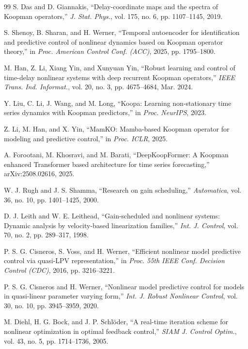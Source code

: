 \documentclass[journal]{IEEEtran}
\begin{document}
\begin{thebibliography}{99}
S. Das and D. Giannakis, ``Delay-coordinate maps and the spectra of Koopman operators,'' \emph{J. Stat. Phys.}, vol. 175, no. 6, pp. 1107--1145, 2019.

S. Shenoy, B. Sharan, and H. Werner, ``Temporal autoencoder for identification and predictive control of nonlinear dynamics based on Koopman operator theory,'' in \emph{Proc. American Control Conf. (ACC)}, 2025, pp. 1795--1800.

M. Han, Z. Li, Xiang Yin, and Xunyuan Yin, ``Robust learning and control of time-delay nonlinear systems with deep recurrent Koopman operators,'' \emph{IEEE Trans. Ind. Informat.}, vol. 20, no. 3, pp. 4675--4684, Mar. 2024.

Y. Liu, C. Li, J. Wang, and M. Long, ``Koopa: Learning non-stationary time series dynamics with Koopman predictors,'' in \emph{Proc. NeurIPS}, 2023.

Z. Li, M. Han, and X. Yin, ``MamKO: Mamba-based Koopman operator for modeling and predictive control,'' in \emph{Proc. ICLR}, 2025.

A. Forootani, M. Khosravi, and M. Barati, ``DeepKoopFormer: A Koopman enhanced Transformer based architecture for time series forecasting,'' arXiv:2508.02616, 2025.

W. J. Rugh and J. S. Shamma, ``Research on gain scheduling,'' \emph{Automatica}, vol. 36, no. 10, pp. 1401--1425, 2000.

D. J. Leith and W. E. Leithead, ``Gain-scheduled and nonlinear systems: Dynamic analysis by velocity-based linearization families,'' \emph{Int. J. Control}, vol. 70, no. 2, pp. 289--317, 1998.

P. S. G. Cisneros, S. Voss, and H. Werner, ``Efficient nonlinear model predictive control via quasi-LPV representation,'' in \emph{Proc. 55th IEEE Conf. Decision Control (CDC)}, 2016, pp. 3216--3221.

P. S. G. Cisneros and H. Werner, ``Nonlinear model predictive control for models in quasi-linear parameter varying form,'' \emph{Int. J. Robust Nonlinear Control}, vol. 30, no. 10, pp. 3945--3959, 2020.

M. Diehl, H. G. Bock, and J. P. Schl\"oder, ``A real-time iteration scheme for nonlinear optimization in optimal feedback control,'' \emph{SIAM J. Control Optim.}, vol. 43, no. 5, pp. 1714--1736, 2005.


\end{thebibliography}
\end{document}
